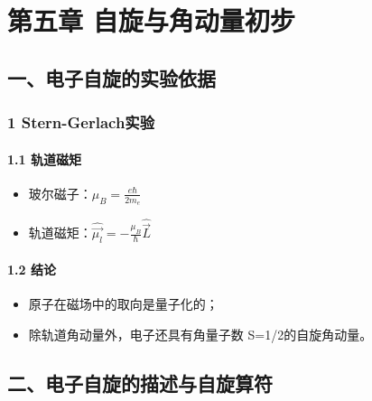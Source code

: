 \documentclass[UTF8,twocolumn]{ctexart}
\date{}
\providecommand{\tightlist}{%
  \setlength{\itemsep}{0pt}\setlength{\parskip}{0pt}}
\let\oldparagraph\paragraph
\renewcommand{\paragraph}[1]{\oldparagraph{#1}\mbox{}}
\begin{document}
\hypertarget{ux7b2cux4e94ux7ae0-ux81eaux65cbux4e0eux89d2ux52a8ux91cfux521dux6b65}{%
\section{第五章{ }
自旋与角动量初步}\label{ux7b2cux4e94ux7ae0-ux81eaux65cbux4e0eux89d2ux52a8ux91cfux521dux6b65}}

\hypertarget{ux4e00ux7535ux5b50ux81eaux65cbux7684ux5b9eux9a8cux4f9dux636e}{%
\subsection{一、电子自旋的实验依据}\label{ux4e00ux7535ux5b50ux81eaux65cbux7684ux5b9eux9a8cux4f9dux636e}}

\hypertarget{stern-gerlachux5b9eux9a8c}{%
\subsubsection{1 Stern-Gerlach实验}\label{stern-gerlachux5b9eux9a8c}}

\hypertarget{ux8f68ux9053ux78c1ux77e9}{%
\paragraph{ 1.1 轨道磁矩}\label{ux8f68ux9053ux78c1ux77e9}}

\begin{itemize}
\tightlist
\item
  玻尔磁子：\(\mu_B=\frac{e\hbar}{2m_e}\)
\item
  轨道磁矩：\(\hat{\vec{\mu_l}}=-\frac{\mu_B}{\hbar}\hat{\vec{L}}\)
\end{itemize}

\hypertarget{ux7ed3ux8bba}{%
\paragraph{ 1.2 结论}\label{ux7ed3ux8bba}}

\begin{itemize}
\tightlist
\item
  原子在磁场中的取向是量子化的；
\item
  除轨道角动量外，电子还具有角量子数 S=1/2的自旋角动量。
\end{itemize}

\hypertarget{ux4e8cux7535ux5b50ux81eaux65cbux7684ux63cfux8ff0ux4e0eux81eaux65cbux7b97ux7b26}{%
\subsection{二、电子自旋的描述与自旋算符}\label{ux4e8cux7535ux5b50ux81eaux65cbux7684ux63cfux8ff0ux4e0eux81eaux65cbux7b97ux7b26}}
\end{document}
